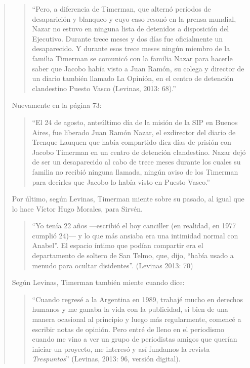 \begin{quote}
\begin{quote}
	\enquote{Pero, a diferencia de Timerman, que alternó períodos de desaparición y blanqueo y cuyo caso resonó en la prensa mundial, Nazar no estuvo en ninguna lista de detenidos a disposición del Ejecutivo. Durante trece meses y dos días fue oficialmente un desaparecido. Y durante esos trece meses ningún miembro de la familia Timerman se comunicó con la familia Nazar para hacerle saber que Jacobo había visto a Juan Ramón, su colega y director de un diario también llamado La Opinión, en el centro de detención clandestino Puesto Vasco (Levinas, 2013: 68).}
\end{quote}


Nuevamente en la página 73:

\begin{quote}
	\enquote{El 24 de agosto, anteúltimo día de la misión de la SIP en Buenos Aires, fue liberado Juan Ramón Nazar, el exdirector del diario de Trenque Lauquen que había compartido diez días de prisión con Jacobo Timerman en un centro de detención clandestino. Nazar dejó de ser un desaparecido al cabo de trece meses durante los cuales su familia no recibió ninguna llamada, ningún aviso de los Timerman para decirles que Jacobo lo había visto en Puesto Vasco.}
\end{quote}


Por último, según Levinas, Timerman miente sobre su pasado, al igual que lo hace Víctor Hugo Morales, para Sirvén.

\begin{quote}
	\enquote{Yo tenía 22 años ---escribió el hoy canciller (en realidad, en 1977 cumplió 24)--- y lo que más ansiaba era una intimidad normal con Anabel''. El espacio íntimo que podían compartir era el departamento de soltero de San Telmo, que, dijo, ``había usado a menudo para ocultar disidentes}. (Levinas 2013: 70)
\end{quote}


Según Levinas, Timerman también miente cuando dice:

\begin{quote}
	\enquote{Cuando regresé a la Argentina en 1989, trabajé mucho en derechos humanos y me ganaba la vida con la publicidad, si bien de una manera ocasional al principio y luego más regularmente, comencé a escribir notas de opinión. Pero entré de lleno en el periodismo cuando me vino a ver un grupo de periodistas amigos que querían iniciar un proyecto, me interesó y así fundamos la revista \emph{Trespuntos}} (Levinas, 2013: 96, versión digital).
\end{quote}



\end{quote}
